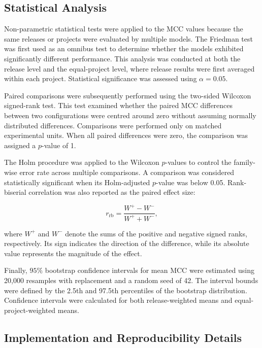 \documentclass[conference]{IEEEtran}
\begin{document}
\subsection{Statistical Analysis}
\label{subsec:statistical-analysis}

Non-parametric statistical tests were applied to the MCC values because
the same releases or projects were evaluated by multiple models. The
Friedman test was first used as an omnibus test to determine whether the
models exhibited significantly different performance. This analysis was
conducted at both the release level and the equal-project level, where
release results were first averaged within each project. Statistical
significance was assessed using \(\alpha=0.05\).

Paired comparisons were subsequently performed using the two-sided
Wilcoxon signed-rank test. This test examined whether the paired MCC
differences between two configurations were centred around zero without
assuming normally distributed differences. Comparisons were performed
only on matched experimental units. When all paired differences were
zero, the comparison was assigned a \(p\)-value of 1.

The Holm procedure was applied to the Wilcoxon \(p\)-values to control
the family-wise error rate across multiple comparisons. A comparison
was considered statistically significant when its Holm-adjusted
\(p\)-value was below 0.05. Rank-biserial correlation was also reported
as the paired effect size:

\begin{equation}
r_{\mathrm{rb}} =
\frac{W^{+}-W^{-}}{W^{+}+W^{-}},
\end{equation}

where \(W^{+}\) and \(W^{-}\) denote the sums of the positive and
negative signed ranks, respectively. Its sign indicates the direction
of the difference, while its absolute value represents the magnitude of
the effect.

Finally, \(95\%\) bootstrap confidence intervals for mean MCC were
estimated using 20,000 resamples with replacement and a random seed of
42. The interval bounds were defined by the 2.5th and 97.5th percentiles
of the bootstrap distribution. Confidence intervals were calculated for
both release-weighted means and equal-project-weighted means.

\subsection{Implementation and Reproducibility Details}
\label{subsec:implementation}
\end{document}
